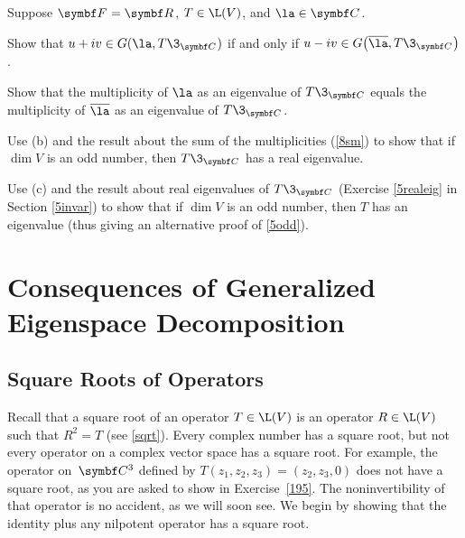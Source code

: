 \begin{exercises}
\exercise
Suppose $\F{} = \R{}$, $T \in \L(V)$, and $\la \in \C{}$.\label{8compmult}
\begin{subtheorem}
\item
Show that $u + iv \in G\paren{ \la, T\3_{\C{}} }$ if and only if $u - iv \in G\paren[\big]{ \overline{\la}, T\3_{\C{}}}$.
\item
Show that the multiplicity of $\la$ as an eigenvalue of $T\3_{\C{}}$ equals the \mbox{multiplicity} of $\bar{\la}$ as an eigenvalue of $T\3_{\C{}}$.
\item
Use (b) and the result about the sum of the multiplicities (\ref{8sm}) to show that if $\dim V$ is an odd number, then $T\3_{\C{}}$ has a real eigenvalue.
\item
Use (c) and the result about real eigenvalues of $T\3_{\C{}}$ (Exercise \ref{5realeig} in Section \ref{5invar}) to show that if $\dim V$ is an odd number, then $T$ has an eigenvalue (thus giving an alternative proof of \ref{5odd}).
\end{subtheorem}


\end{exercises}

\CrCom

\section[Consequences of Generalized Eigenspace Decomposition]{\hspace*{-2.1bp}Consequences of Generalized Eigenspace Decomposition} \label{8geneigde}

\subsection{Square Roots of Operators}

Recall that a square root of an operator $T \in \L(V)$ is an operator $R \in \L(V)$
such that $R^2 = T$ (see \ref{sqrt}). Every complex number has a square root, but not every operator on
a complex vector space has a square root.
For example, the operator on~$\C{3}$ defined by $T(z_1, z_2, z_3) = (z_2, z_3, 0)$ does not have a square root, as you are asked to show in Exercise~\ref{195}.  The noninvertibility of that operator is no accident, as we will soon see.  We begin by showing that the identity plus any nilpotent operator has a square root.

